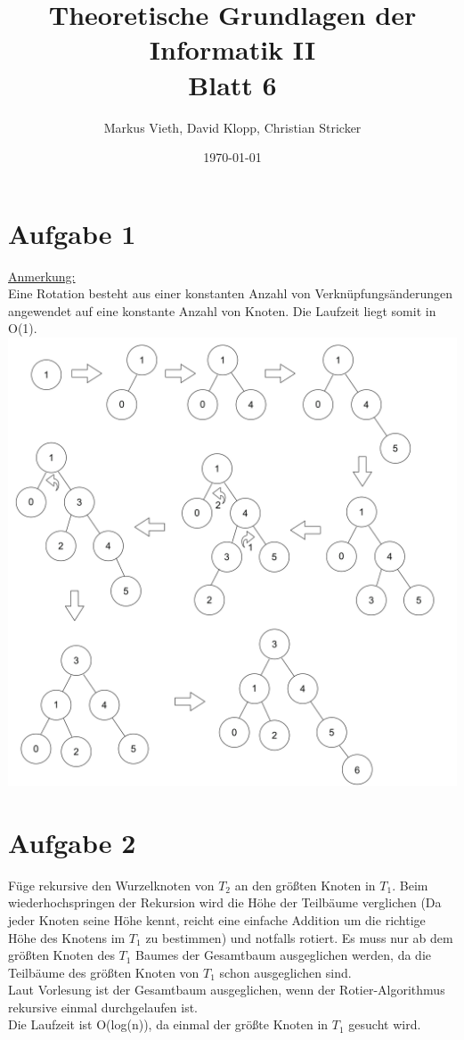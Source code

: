 \documentclass[a4paper,11pt,twoside]{article}
\title{Theoretische Grundlagen der Informatik II\\ Blatt 6}
\author{Markus Vieth, David Klopp, Christian Stricker}
\date{\today}
\begin{document}
\maketitle
\cleardoublepage
\pagestyle{myheadings}

\section*{Aufgabe 1}
\underline{Anmerkung: }\\ Eine Rotation besteht aus einer konstanten Anzahl von Verknüpfungsänderungen angewendet auf eine konstante Anzahl von Knoten. Die Laufzeit liegt somit in O(1). \\
\includegraphics*[scale=0.2]{Images/Nr_1.png}

\section*{Aufgabe 2}
Füge rekursive den Wurzelknoten von $T_2$ an den größten Knoten in $T_1$. Beim wiederhochspringen der Rekursion wird die Höhe der Teilbäume verglichen (Da jeder Knoten seine Höhe kennt, reicht eine einfache Addition um die richtige Höhe des Knotens im $T_1$ zu bestimmen) und notfalls rotiert. Es muss nur ab dem größten Knoten des $T_1$ Baumes der Gesamtbaum ausgeglichen werden, da die Teilbäume des größten Knoten von $T_1$ schon ausgeglichen sind. \\
Laut Vorlesung ist der Gesamtbaum ausgeglichen, wenn der Rotier-Algorithmus rekursive einmal durchgelaufen ist. \\
Die Laufzeit ist O(log(n)), da einmal der größte Knoten in $T_1$ gesucht wird. 
\end{document}
